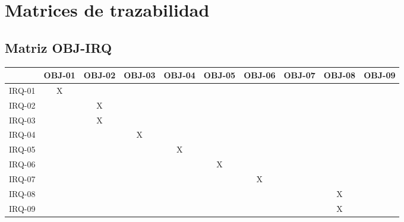 
\section{Matrices de trazabilidad}\label{sec:matrices-trazabilidad}
\subsection{Matriz OBJ-IRQ}
\begin{table}[!ht]
    \centering
    \small
    \begin{tabular}{|c|c|c|c|c|c|c|c|c|c|}
    \hline
        ~ & OBJ-01 & OBJ-02 & OBJ-03 & OBJ-04 & OBJ-05 & OBJ-06 & OBJ-07 & OBJ-08 & OBJ-09 \\ \hline
        IRQ-01 & X & ~ & ~ & ~ & ~ & ~ & ~ & ~ & ~ \\ \hline
        IRQ-02 & ~ & X & ~ & ~ & ~ & ~ & ~ & ~ & ~ \\ \hline
        IRQ-03 & ~ & X & ~ & ~ & ~ & ~ & ~ & ~ & ~ \\ \hline
        IRQ-04 & ~ & ~ & X & ~ & ~ & ~ & ~ & ~ & ~ \\ \hline
        IRQ-05 & ~ & ~ & ~ & X & ~ & ~ & ~ & ~ & ~ \\ \hline
        IRQ-06 & ~ & ~ & ~ & ~ & X & ~ & ~ & ~ & ~ \\ \hline
        IRQ-07 & ~ & ~ & ~ & ~ & ~ & X & ~ & ~ & ~ \\ \hline
        IRQ-08 & ~ & ~ & ~ & ~ & ~ & ~ & ~ & X & ~ \\ \hline
        IRQ-09 & ~ & ~ & ~ & ~ & ~ & ~ & ~ & X & ~ \\ \hline
    \end{tabular}
\end{table}

\newpage
